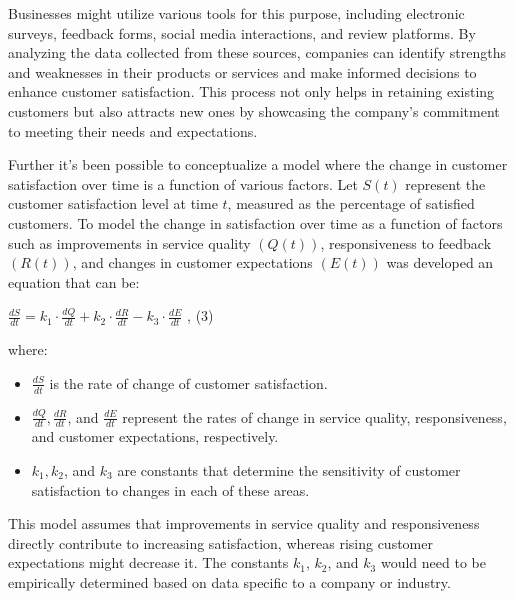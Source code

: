 {Businesses might utilize various tools for this purpose, including
electronic surveys, feedback forms, social media interactions, and
review platforms. By analyzing the data collected from these sources,
companies can identify strengths and weaknesses in their products or
services and make informed decisions to enhance customer satisfaction.
This process not only helps in retaining existing customers but also
attracts new ones by showcasing the company's commitment to meeting
their needs and expectations.

Further it's been possible to conceptualize a model where the change in
customer satisfaction over time is a function of various factors. Let
\(S(t)\) represent the customer satisfaction level at time \(t\),
measured as the percentage of satisfied customers. To model the change
in satisfaction over time as a function of factors such as improvements
in service quality \((Q(t))\), responsiveness to feedback \((R(t))\),
and changes in customer expectations \((E(t))\) was developed an
equation that can be:

\(\frac{dS}{dt} = k_{1} \cdot \frac{dQ}{dt} + k_{2} \cdot \frac{dR}{dt} - k_{3} \cdot \frac{dE}{dt}\)
, (3)

where:

\begin{itemize}
\item
  \(\frac{dS}{dt}\) is the rate of change of customer satisfaction.
\item
  \(\frac{dQ}{dt},\frac{dR}{dt}\), and \(\frac{dE}{dt}\) represent the
  rates of change in service quality, responsiveness, and customer
  expectations, respectively.
\item
  \(k_{1},k_{2}\), and \(k_{3}\) are constants that determine the
  sensitivity of customer satisfaction to changes in each of these
  areas.
\end{itemize}

This model assumes that improvements in service quality and
responsiveness directly contribute to increasing satisfaction, whereas
rising customer expectations might decrease it. The constants \(k_{1}\),
\(k_{2}\), and \(k_{3}\) would need to be empirically determined based
on data specific to a company or industry.

}
